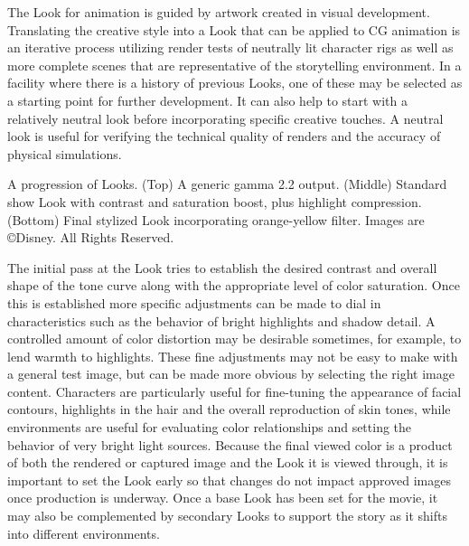 The Look for animation is guided by artwork created in visual development. Translating the creative style into a Look that can be applied to CG animation is an iterative process utilizing render tests of neutrally lit character rigs as well as more complete scenes that are representative of the storytelling environment. In a facility where there is a history of previous Looks, one of these may be selected as a starting point for further development. It can also help to start with a relatively neutral look before incorporating specific creative touches. A neutral look is useful for verifying the technical quality of renders and the accuracy of physical simulations.




A progression of Looks. (Top) A generic gamma 2.2 output. (Middle) Standard show Look with contrast and saturation boost, plus highlight compression. (Bottom) Final stylized Look incorporating orange-yellow filter. 
 Images are ©Disney. All Rights Reserved.

The initial pass at the Look tries to establish the desired contrast and overall shape of the tone curve along with the appropriate level of color saturation. Once this is established more specific adjustments can be made to dial in characteristics such as the behavior of bright highlights and shadow detail. A controlled amount of color distortion may be desirable sometimes, for example, to lend warmth to highlights. These fine adjustments may not be easy to make with a general test image, but can be made more obvious by selecting the right image content. Characters are particularly useful for fine-tuning the appearance of facial contours, highlights in the hair and the overall reproduction of skin tones, while environments are useful for evaluating color relationships and setting the behavior of very bright light sources. Because the final viewed color is a product of both the rendered or captured image and the Look it is viewed through, it is important to set the Look early so that changes do not impact approved images once production is underway. Once a base Look has been set for the movie, it may also be complemented by secondary Looks to support the story as it shifts into different environments.




